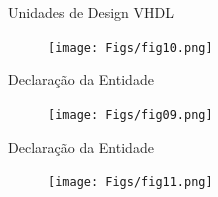 \documentclass[aspectratio=169]{beamer}
\begin{document}
\begin{frame}{Unidades de Design VHDL}
	\justifying
	
	
	\begin{figure}[h]
		\centering
		\texttt{[image: Figs/fig10.png]}
	\end{figure}
	
	
\end{frame}
\begin{frame}{Declaração da Entidade}
	\justifying
	
	
	\begin{figure}[h]
		\centering
		\texttt{[image: Figs/fig09.png]}
	\end{figure}
	
	
\end{frame}
\begin{frame}{Declaração da Entidade}
	\justifying
	
	
	\begin{figure}[h]
		\centering
		\texttt{[image: Figs/fig11.png]}
	\end{figure}
	
	
\end{frame}
%	
%	
%	
%
%	
\end{document}
